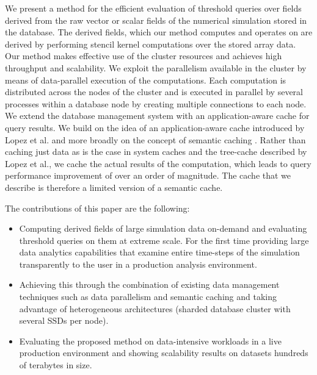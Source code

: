 \documentclass{sig-alternate}
\begin{document}
We present a method for the efficient evaluation of threshold queries over fields derived from the raw vector or scalar fields of the numerical simulation 
stored in the database. The derived fields, which our method computes and operates on are derived by performing stencil kernel computations over the 
stored array data.
Our method makes effective use of the cluster resources and achieves high throughput and scalability. 
We exploit the parallelism 
available in the cluster by means of data-parallel execution of the computations. Each computation is distributed across the nodes of the cluster and
is executed in parallel by several processes within a database node by creating multiple connections to each node. We extend the database management
system with an
application-aware cache for query results. We build on the idea of an application-aware cache introduced by Lopez et al. \cite{Lopez} and more broadly 
on the concept of semantic caching \cite{Dar}. Rather than caching just data as is the case in system caches and the tree-cache described by Lopez et al.,
we cache the actual results of the computation, which leads to query performance improvement of over an order of magnitude.
The cache that we describe is therefore a limited version of a semantic cache.

The contributions of this paper are the following:
\begin{itemize}
\item Computing derived fields of large simulation data on-demand and evaluating threshold queries on them at extreme scale. For the first time providing large
data analytics capabilities that examine entire time-steps of the simulation transparently to the user in a production analysis environment.
\item Achieving this through the combination of existing data management techniques such as data parallelism and semantic caching and taking advantage of heterogeneous architectures (sharded database cluster with several SSDs per node).
\item Evaluating the proposed method on data-intensive workloads in a live production environment and showing scalability results on datasets hundreds of terabytes in size.
\end{itemize}

\end{document}
